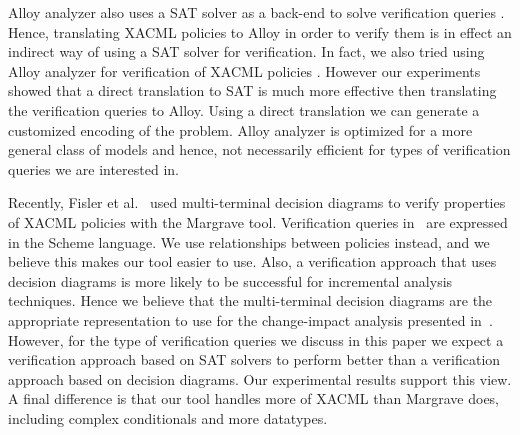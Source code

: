 Alloy analyzer also uses a SAT solver as a back-end to solve verification
queries \cite{jackson00automating,jackson:alcoa}. 
Hence, translating XACML policies to Alloy in order to verify them
is in effect an indirect way of using a SAT solver for verification.
In fact, we also tried using Alloy analyzer for verification of XACML policies \cite{hughes04}.
However our experiments showed that a direct
translation to SAT is much more effective then translating
the verification queries to Alloy. 
Using a direct translation we can generate a customized encoding 
of the problem. Alloy analyzer is optimized for a more general class
of models and hence, not necessarily efficient for types of verification
queries we are interested in.

Recently, Fisler et al.~\cite{fisler05} used multi-terminal decision
diagrams to verify properties of XACML policies with the Margrave
tool.  Verification queries in~\cite{fisler05} are expressed in the
Scheme language.  We use relationships between policies instead, and
we believe this makes our tool easier to use.  Also, a verification
approach that uses decision diagrams is more likely to be successful
for incremental analysis techniques.  Hence we believe that the
multi-terminal decision diagrams are the appropriate representation to
use for the change-impact analysis presented in~\cite{fisler05}.
However, for the type of verification queries we discuss in this paper
we expect a verification approach based on SAT solvers to perform
better than a verification approach based on decision diagrams.  Our
experimental results support this view.  A final difference is that
our tool handles more of XACML than Margrave does, including complex
conditionals and more datatypes.

